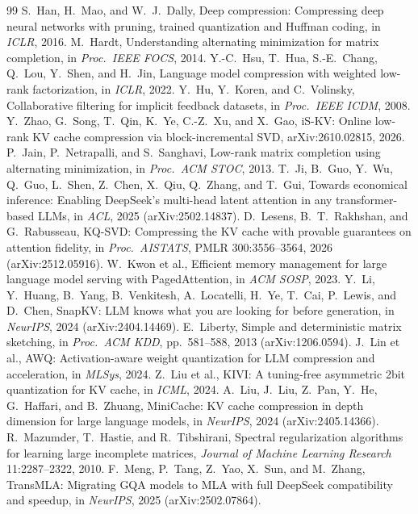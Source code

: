 \documentclass[10pt]{article}
\theoremstyle{plain}
\theoremstyle{definition}
\theoremstyle{remark}
\begin{document}
{\begin{thebibliography}{99}
 S.~Han, H.~Mao, and W.~J.~Dally, Deep compression: Compressing deep neural networks with pruning, trained quantization and Huffman coding, in \emph{ICLR}, 2016.
 M.~Hardt, Understanding alternating minimization for matrix completion, in \emph{Proc.\ IEEE FOCS}, 2014.
 Y.-C.~Hsu, T.~Hua, S.-E.~Chang, Q.~Lou, Y.~Shen, and H.~Jin, Language model compression with weighted low-rank factorization, in \emph{ICLR}, 2022.
 Y.~Hu, Y.~Koren, and C.~Volinsky, Collaborative filtering for implicit feedback datasets, in \emph{Proc.\ IEEE ICDM}, 2008.
 Y.~Zhao, G.~Song, T.~Qin, K.~Ye, C.-Z.~Xu, and X.~Gao, iS-KV: Online low-rank KV cache compression via block-incremental SVD, arXiv:2610.02815, 2026.
 P.~Jain, P.~Netrapalli, and S.~Sanghavi, Low-rank matrix completion using alternating minimization, in \emph{Proc.\ ACM STOC}, 2013.
 T.~Ji, B.~Guo, Y.~Wu, Q.~Guo, L.~Shen, Z.~Chen, X.~Qiu, Q.~Zhang, and T.~Gui, Towards economical inference: Enabling DeepSeek's multi-head latent attention in any transformer-based LLMs, in \emph{ACL}, 2025 (arXiv:2502.14837).
 D.~Lesens, B.~T.~Rakhshan, and G.~Rabusseau, KQ-SVD: Compressing the KV cache with provable guarantees on attention fidelity, in \emph{Proc.\ AISTATS}, PMLR 300:3556--3564, 2026 (arXiv:2512.05916).
 W.~Kwon et al., Efficient memory management for large language model serving with PagedAttention, in \emph{ACM SOSP}, 2023.
 Y.~Li, Y.~Huang, B.~Yang, B.~Venkitesh, A.~Locatelli, H.~Ye, T.~Cai, P.~Lewis, and D.~Chen, SnapKV: LLM knows what you are looking for before generation, in \emph{NeurIPS}, 2024 (arXiv:2404.14469).
 E.~Liberty, Simple and deterministic matrix sketching, in \emph{Proc.\ ACM KDD}, pp.~581--588, 2013 (arXiv:1206.0594).
 J.~Lin et al., AWQ: Activation-aware weight quantization for LLM compression and acceleration, in \emph{MLSys}, 2024.
 Z.~Liu et al., KIVI: A tuning-free asymmetric 2bit quantization for KV cache, in \emph{ICML}, 2024.
 A.~Liu, J.~Liu, Z.~Pan, Y.~He, G.~Haffari, and B.~Zhuang, MiniCache: KV cache compression in depth dimension for large language models, in \emph{NeurIPS}, 2024 (arXiv:2405.14366).
 R.~Mazumder, T.~Hastie, and R.~Tibshirani, Spectral regularization algorithms for learning large incomplete matrices, \emph{Journal of Machine Learning Research} 11:2287--2322, 2010.
 F.~Meng, P.~Tang, Z.~Yao, X.~Sun, and M.~Zhang, TransMLA: Migrating GQA models to MLA with full DeepSeek compatibility and speedup, in \emph{NeurIPS}, 2025 (arXiv:2502.07864).

\end{thebibliography}}
\end{document}
